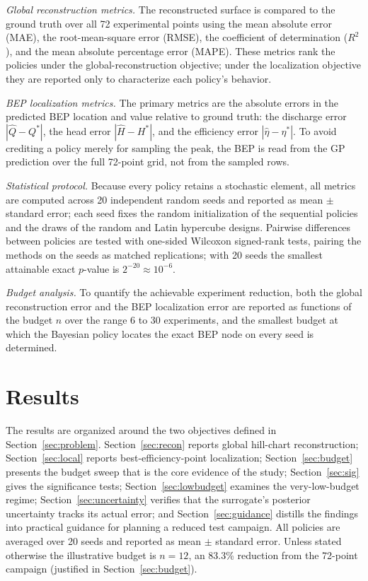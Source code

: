 \documentclass[preprint,12pt]{elsarticle}
\begin{document}
\emph{Global reconstruction metrics.} The reconstructed surface is compared to the
ground truth over all 72 experimental points using the mean absolute error (MAE), the
root-mean-square error (RMSE), the coefficient of determination ($R^2$), and the mean
absolute percentage error (MAPE). These metrics rank the policies under the
global-reconstruction objective; under the localization objective they are reported
only to characterize each policy's behavior.

\emph{BEP localization metrics.} The primary metrics are the absolute errors in the
predicted BEP location and value relative to ground truth: the discharge error
$|\hat{Q} - Q^\ast|$, the head error $|\hat{H} - H^\ast|$, and the efficiency error
$|\hat{\eta} - \eta^\ast|$. To avoid crediting a policy merely for sampling the peak,
the BEP is read from the GP prediction over the full 72-point grid, not from the
sampled rows.

\emph{Statistical protocol.} Because every policy retains a stochastic element, all
metrics are computed across 20 independent random seeds and reported as mean
$\pm$ standard error; each seed fixes the random initialization of the sequential
policies and the draws of the random and Latin hypercube designs. Pairwise
differences between policies are tested with one-sided Wilcoxon signed-rank tests,
pairing the methods on the seeds as matched replications; with 20 seeds the smallest
attainable exact $p$-value is $2^{-20} \approx 10^{-6}$.

\emph{Budget analysis.} To quantify the achievable experiment reduction, both the
global reconstruction error and the BEP localization error are reported as functions
of the budget $n$ over the range 6 to 30 experiments, and the smallest budget at which
the Bayesian policy locates the exact BEP node on every seed is determined.

\section{Results}\label{sec:results}
The results are organized around the two objectives defined in
Section~\ref{sec:problem}. Section~\ref{sec:recon} reports global hill-chart
reconstruction; Section~\ref{sec:local} reports best-efficiency-point localization;
Section~\ref{sec:budget} presents the budget sweep that is the core evidence of the
study; Section~\ref{sec:sig} gives the significance tests; Section~\ref{sec:lowbudget}
examines the very-low-budget regime; Section~\ref{sec:uncertainty} verifies that the
surrogate's posterior uncertainty tracks its actual error; and
Section~\ref{sec:guidance} distills the findings into practical guidance for planning a
reduced test campaign. All policies are
averaged over 20 seeds and reported as mean $\pm$ standard error. Unless stated
otherwise the illustrative budget is $n = 12$, an 83.3\% reduction from the 72-point
campaign (justified in Section~\ref{sec:budget}).
\end{document}
